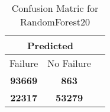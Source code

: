 \begin{table}[] 
\caption{Confusion Matric for RandomForest20} 
\label{Table: Prediction Accuracy-NoneRandomForest20OnlySunEKF-ignoreReflection-Reflection} 
\centering 
\begin{tabular} 
 {@{}ccc@{}} 
\toprule 
\multicolumn{2}{c}{\textbf{Predicted}}
 \\ \midrule 
\multicolumn{1}{|c|}{Failure} & 
\multicolumn{1}{c|}{No Failure}
 \\ \midrule 
\multicolumn{1}{|c|}{\color{green}\textbf{93669}} & 
\multicolumn{1}{c|}{\color{red}\textbf{863}}
 \\ \midrule 
\multicolumn{1}{|c|}{\color{red}\textbf{22317}} & 
\multicolumn{1}{c|}{\color{green}\textbf{53279}}
 \\ \bottomrule 
\end{tabular} 
\end{table} 
